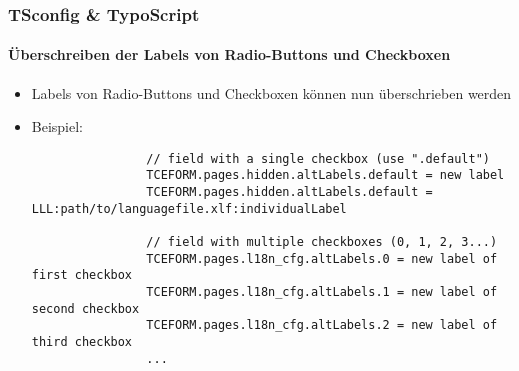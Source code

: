 
\begin{frame}[fragile]
	\frametitle{TSconfig \& TypoScript}
	\framesubtitle{Überschreiben der Labels von Radio-Buttons und Checkboxen}

	\lstset{basicstyle=\tiny\ttfamily}

	\begin{itemize}

		\item Labels von Radio-Buttons und Checkboxen können nun überschrieben werden
		\item Beispiel:

			\begin{lstlisting}
				// field with a single checkbox (use ".default")
				TCEFORM.pages.hidden.altLabels.default = new label
				TCEFORM.pages.hidden.altLabels.default = LLL:path/to/languagefile.xlf:individualLabel

				// field with multiple checkboxes (0, 1, 2, 3...)
				TCEFORM.pages.l18n_cfg.altLabels.0 = new label of first checkbox
				TCEFORM.pages.l18n_cfg.altLabels.1 = new label of second checkbox
				TCEFORM.pages.l18n_cfg.altLabels.2 = new label of third checkbox
				...
			\end{lstlisting}

	\end{itemize}

\end{frame}


